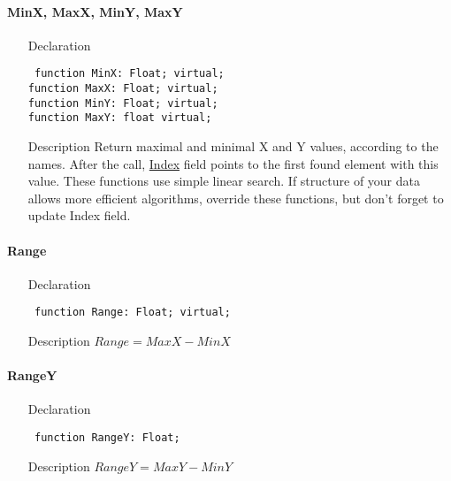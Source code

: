 \documentclass[12pt,a4paper,oneside]{report}
\newcommand{\declarationitem}[1]{{\addfontfeatures{FakeSlant} #1}}
\newcommand{\descriptiontitle}[1]{{\addfontfeatures{FakeSlant}#1}}
\newcommand{\code}[1]{\texttt{#1}}
\begin{document}
\paragraph{MinX, MaxX, MinY, MaxY}
\label{lmPointsVec.TPoints-MinX}
\begin{itemize}
	\item[\declarationitem{Declaration}\hfill]
	\begin{flushleft}
		\code{
			function MinX: Float; virtual;\\
			function MaxX: Float; virtual;\\
			function MinY: Float; virtual;\\
			function MaxY: float virtual;}
	\end{flushleft}
	\item[\descriptiontitle{Description}]
	Return maximal and minimal X and Y values, according to the names. After the call, \hyperref[lmPointsVec.TPoints-Index]{Index} field points to the first found element with this value. These functions use simple linear search. If structure of your data allows more efficient algorithms, override these functions, but don't forget to update Index field. 
\end{itemize}
\label{lmPointsVec.TPoints-Range}
\paragraph{Range}
\begin{itemize}
\item[\declarationitem{Declaration}\hfill]
\begin{flushleft}
	\code{
		function Range: Float; virtual;}
\end{flushleft}
\item[\descriptiontitle{Description}]
$Range=MaxX-MinX$\label{lmPointsVec.TPoints-RangeY}
\end{itemize}
\paragraph{RangeY}
\begin{itemize}
\item[\declarationitem{Declaration}\hfill]
\begin{flushleft}
	\code{
		function RangeY: Float;}
\end{flushleft}
\item[\descriptiontitle{Description}]
$RangeY=MaxY-MinY$
\end{itemize}
\end{document}
